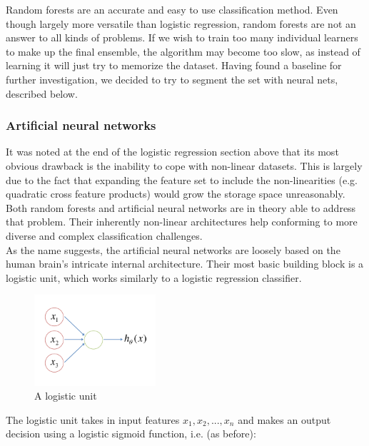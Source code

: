 \documentclass[a4paper, 11pt]{article}
\numberwithin{equation}{section}
\begin{document}
		\noindent Random forests are an accurate and easy to use classification method. Even though largely more versatile than logistic regression, random forests are not an answer to all kinds of problems. If we wish to train too many individual learners to make up the final ensemble, the algorithm may become too slow, as instead of learning it will just try to memorize the dataset. Having found a baseline for further investigation, we decided to try to segment the set with neural nets, described below.
		
		\subsubsection{Artificial neural networks}
		\cite{ng2015coursera} It was noted at the end of the logistic regression section above that its most obvious drawback is the inability to cope with non-linear datasets. This is largely due to the fact that expanding the feature set to include the non-linearities (e.g. quadratic cross feature products) would grow the storage space unreasonably. Both random forests and artificial neural networks are in theory able to address that problem. Their inherently non-linear architectures help conforming to more diverse and complex classification challenges. \\
		
		\noindent As the name suggests, the artificial neural networks are loosely based on the human brain's intricate internal architecture. Their most basic building block is a logistic unit, which works similarly to a logistic regression classifier.
		
		\begin{figure}[!h]
			\centering
			\includegraphics[page=1,width=0.40\textwidth]{logistic_unit.pdf}
			\caption{\label{fig:logistic_unit}{A logistic unit}}
		\end{figure}
		
		\noindent The logistic unit takes in input features $x_1, x_2, ..., x_n$ and makes an output decision using a logistic sigmoid function, i.e. (as before):
		
\end{document}
